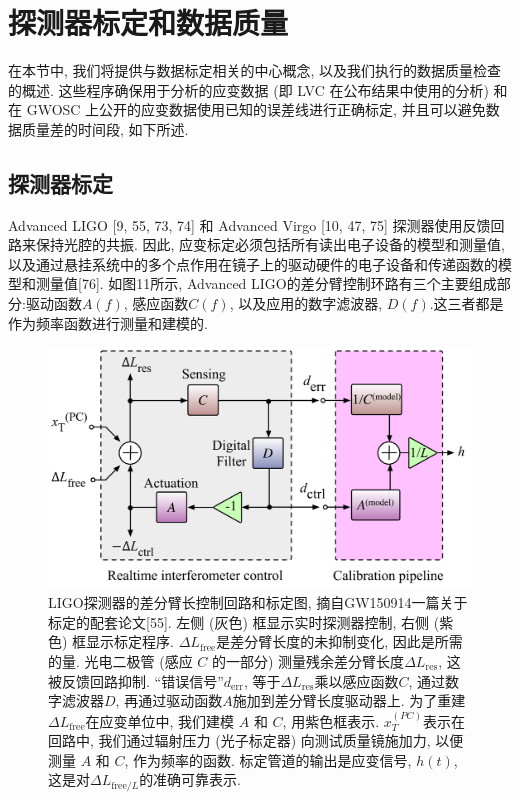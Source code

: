 \documentclass[a4paper]{\documentclassname}
\def\t{\text}
\theoremstyle{definition}
\begin{document}
\section{探测器标定和数据质量}

在本节中, 我们将提供与数据标定相关的中心概念, 以及我们执行的数据质量检查的概述. 这些程序确保用于分析的应变数据 (即 LVC 在公布结果中使用的分析) 和在 GWOSC 上公开的应变数据使用已知的误差线进行正确标定, 并且可以避免数据质量差的时间段, 如下所述. 

\subsection{探测器标定}

Advanced LIGO [9,  55,  73,  74] 和 Advanced Virgo [10,  47,  75] 探测器使用反馈回路来保持光腔的共振. 因此, 应变标定必须包括所有读出电子设备的模型和测量值, 以及通过悬挂系统中的多个点作用在镜子上的驱动硬件的电子设备和传递函数的模型和测量值[76]. 如图11所示, Advanced LIGO的差分臂控制环路有三个主要组成部分:驱动函数$A (f) $, 感应函数$C (f) $, 以及应用的数字滤波器, $D (f) $.这三者都是作为频率函数进行测量和建模的. 
\begin{figure}[htbp]
    \centering
    \includegraphics{img/11.jpg}
    \caption{
        LIGO探测器的差分臂长控制回路和标定图, 摘自GW150914一篇关于标定的配套论文[55]. 左侧 (灰色) 框显示实时探测器控制, 右侧 (紫色) 框显示标定程序. $\Delta L_{\t{free}}$是差分臂长度的未抑制变化, 因此是所需的量. 光电二极管 (感应 $C$ 的一部分) 测量残余差分臂长度$\Delta L_{\t{res}}$, 这被反馈回路抑制. ``错误信号''$d_{\t{err}}$, 等于$\Delta L_{\t{res}}$乘以感应函数$C$, 通过数字滤波器$D$, 再通过驱动函数$A$施加到差分臂长度驱动器上. 为了重建$\Delta L_{\t{free}}$在应变单位中, 我们建模 $A$ 和 $C$, 用紫色框表示. $x_{T}^{ (PC) }$表示在回路中, 我们通过辐射压力 (光子标定器) 向测试质量镜施加力, 以便测量 $A$ 和 $C$, 作为频率的函数. 标定管道的输出是应变信号, $h(t)$, 这是对$\Delta L_{\t{free}/L}$的准确可靠表示.
    }
\end{figure}
\end{document}
